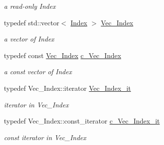 \begin{Indent}
\begin{DoxyCompactItemize}
\begin{DoxyCompactList}\small\item\em a read-\/only Index \end{DoxyCompactList}\item 
\mbox{\label{class_s_m_spp__di__unipi__it_1_1_m_c_f_block_a9a1284953e2aa5222b5867c0a7f98499}} 
typedef std\+::vector$<$ \mbox{\hyperlink{class_s_m_spp__di__unipi__it_1_1_m_c_f_block_ad53d6229d7ec28555a9c9c2fd9abf773}{Index}} $>$ \mbox{\hyperlink{class_s_m_spp__di__unipi__it_1_1_m_c_f_block_a9a1284953e2aa5222b5867c0a7f98499}{Vec\+\_\+\+Index}}
\begin{DoxyCompactList}\small\item\em a vector of Index \end{DoxyCompactList}\item 
\mbox{\label{class_s_m_spp__di__unipi__it_1_1_m_c_f_block_a03461123d4f6090aefeb97ef653d3f2b}} 
typedef const \mbox{\hyperlink{class_s_m_spp__di__unipi__it_1_1_m_c_f_block_a9a1284953e2aa5222b5867c0a7f98499}{Vec\+\_\+\+Index}} \mbox{\hyperlink{class_s_m_spp__di__unipi__it_1_1_m_c_f_block_a03461123d4f6090aefeb97ef653d3f2b}{c\+\_\+\+Vec\+\_\+\+Index}}
\begin{DoxyCompactList}\small\item\em a const vector of Index \end{DoxyCompactList}\item 
\mbox{\label{class_s_m_spp__di__unipi__it_1_1_m_c_f_block_a336c0da3af386a947fce16fc19e02cc7}} 
typedef Vec\+\_\+\+Index\+::iterator \mbox{\hyperlink{class_s_m_spp__di__unipi__it_1_1_m_c_f_block_a336c0da3af386a947fce16fc19e02cc7}{Vec\+\_\+\+Index\+\_\+it}}
\begin{DoxyCompactList}\small\item\em iterator in Vec\+\_\+\+Index \end{DoxyCompactList}\item 
\mbox{\label{class_s_m_spp__di__unipi__it_1_1_m_c_f_block_a1227a7b23529518a80147f2f5fca4d63}} 
typedef Vec\+\_\+\+Index\+::const\+\_\+iterator \mbox{\hyperlink{class_s_m_spp__di__unipi__it_1_1_m_c_f_block_a1227a7b23529518a80147f2f5fca4d63}{c\+\_\+\+Vec\+\_\+\+Index\+\_\+it}}
\begin{DoxyCompactList}\small\item\em const iterator in Vec\+\_\+\+Index \end{DoxyCompactList}\item 

\end{DoxyCompactItemize}
\end{Indent}
